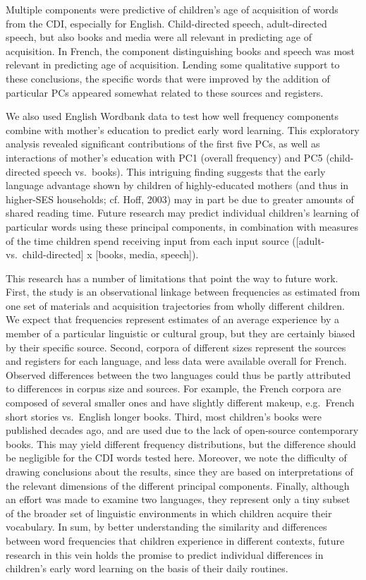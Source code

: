\documentclass[10pt, letterpaper]{article}
\begin{document}
Multiple components were predictive of children's age of acquisition of
words from the CDI, especially for English. Child-directed speech,
adult-directed speech, but also books and media were all relevant in
predicting age of acquisition. In French, the component distinguishing
books and speech was most relevant in predicting age of acquisition.
Lending some qualitative support to these conclusions, the specific
words that were improved by the addition of particular PCs appeared
somewhat related to these sources and registers.

We also used English Wordbank data to test how well frequency components
combine with mother's education to predict early word learning. This
exploratory analysis revealed significant contributions of the first
five PCs, as well as interactions of mother's education with PC1
(overall frequency) and PC5 (child-directed speech vs.~books). This
intriguing finding suggests that the early language advantage shown by
children of highly-educated mothers (and thus in higher-SES households;
cf. Hoff, 2003) may in part be due to greater amounts of shared reading
time. Future research may predict individual children's learning of
particular words using these principal components, in combination with
measures of the time children spend receiving input from each input
source ({[}adult- vs.~child-directed{]} x {[}books, media, speech{]}).

This research has a number of limitations that point the way to future
work. First, the study is an observational linkage between frequencies
as estimated from one set of materials and acquisition trajectories from
wholly different children. We expect that frequencies represent
estimates of an average experience by a member of a particular
linguistic or cultural group, but they are certainly biased by their
specific source. Second, corpora of different sizes represent the
sources and registers for each language, and less data were available
overall for French. Observed differences between the two languages could
thus be partly attributed to differences in corpus size and sources. For
example, the French corpora are composed of several smaller ones and
have slightly different makeup, e.g.~French short stories vs.~English
longer books. Third, most children's books were published decades ago,
and are used due to the lack of open-source contemporary books. This may
yield different frequency distributions, but the difference should be
negligible for the CDI words tested here. Moreover, we note the
difficulty of drawing conclusions about the results, since they are
based on interpretations of the relevant dimensions of the different
principal components. Finally, although an effort was made to examine
two languages, they represent only a tiny subset of the broader set of
linguistic environments in which children acquire their vocabulary. In
sum, by better understanding the similarity and differences between word
frequencies that children experience in different contexts, future
research in this vein holds the promise to predict individual
differences in children's early word learning on the basis of their
daily routines.
\end{document}
